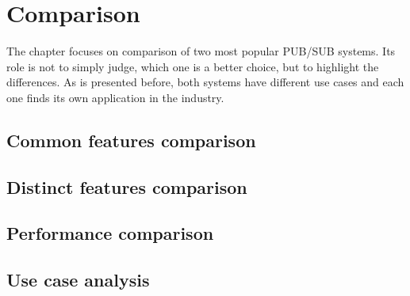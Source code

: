\chapter{Comparison}
\label{cha:comparison}

The chapter focuses on comparison of two most popular PUB/SUB systems. Its role is not to simply judge, which one is a better choice, but to highlight the differences. As is presented before, both systems have different use cases and each one finds its own application in the industry. 


\section{Common features comparison}
\label{sec:commonFeatures}


\section{Distinct features comparison}
\label{sec:distinctFeatures}


\section{Performance comparison}
\label{sec:performance}


\section{Use case analysis}
\label{sec:useCase}

